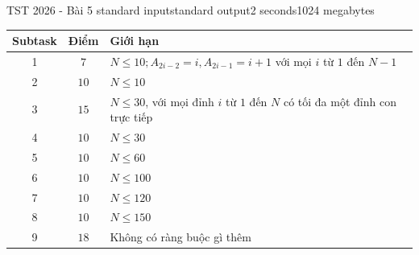 \begin{problem}{TST 2026 - Bài 5 }{standard input}{standard output}{2 seconds}{1024 megabytes}
\Scoring
\begin{center}
  \begin{tabular}{|c|c|l|} \hline
    \textbf{Subtask} & \textbf{Điểm} & \textbf{Giới hạn} \\ \hline
    1 & $7$ & $N\le 10; A_{2i-2}=i,A_{2i-1}=i+1$ với mọi $i$ từ $1$ đến $N-1$ \\ \hline
    2 & $10$ & $N\le 10$ \\ \hline
    3 & $15$ & $N\le 30$, với mọi đỉnh $i$ từ $1$ đến $N$ có tối đa một đỉnh con trực tiếp \\ \hline
    4 & $10$ & $N\le 30$ \\ \hline
    5 & $10$ & $N\le 60$ \\ \hline
    6 & $10$ & $N\le 100$ \\ \hline
    7 & $10$ & $N\le 120$ \\ \hline
    8 & $10$ & $N\le 150$ \\ \hline
    9 & $18$ & Không có ràng buộc gì thêm \\ \hline
  \end{tabular}
\end{center}


\end{problem}

